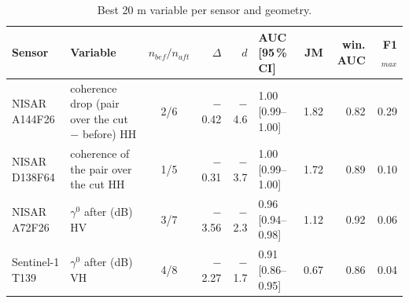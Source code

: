\begin{table}[htbp]
\centering
\scriptsize
\caption{Best 20 m variable per sensor and geometry.}
\label{tab:best}
\begin{tabular}{llcrrlrrr}
\toprule
Sensor & Variable & $n_{bef}/n_{aft}$ & $\Delta$ & $d$ & AUC [95\,\% CI] & JM & win. AUC & F1$_{max}$ \\
\midrule
NISAR A144F26 & coherence drop (pair over the cut $-$ before) HH & 2/6 & $-$0.42 & $-$4.6 & 1.00 [0.99--1.00] & 1.82 & 0.82 & 0.29 \\
\addlinespace
NISAR D138F64 & coherence of the pair over the cut HH & 1/5 & $-$0.31 & $-$3.7 & 1.00 [0.99--1.00] & 1.72 & 0.89 & 0.10 \\
\addlinespace
NISAR A72F26 & $\gamma^0$ after (dB) HV & 3/7 & $-$3.56 & $-$2.3 & 0.96 [0.94--0.98] & 1.12 & 0.92 & 0.06 \\
\addlinespace
Sentinel-1 T139 & $\gamma^0$ after (dB) VH & 4/8 & $-$2.27 & $-$1.7 & 0.91 [0.86--0.95] & 0.67 & 0.86 & 0.04 \\
\bottomrule
\end{tabular}
\end{table}
